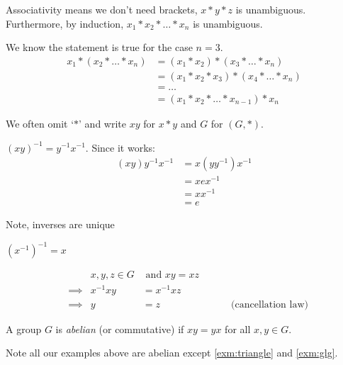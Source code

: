 \begin{remark}
Associativity means we don't need brackets, $x * y * z$ is unambiguous.
Furthermore, by induction, $x_1 * x_2 * \dots * x_n$ is unambiguous.

We know the statement is true for the case $n = 3$.
\begin{align*}
    x_1 * (x_2 * \dots * x_n) &= (x_1 * x_2) * (x_3 * \dots * x_n) \\
    &= (x_1 * x_2 * x_3) * (x_4 * \dots * x_n) \\
    &= \dots \\
    &= (x_1 * x_2 * \dots * x_{n-1}) * x_n
\end{align*}
\end{remark}

\begin{remark}
We often omit `$*$' and write $x y$ for $x * y$ and $G$ for $(G, *)$.
\end{remark}

\begin{remark}
$(xy)^{-1} = y^{-1} x^{-1}$. Since it works:
\begin{align*}
    (xy)y^{-1}x^{-1} &= x(y y^{-1})x^{-1} \\
    &= x e x^{-1} \\
    &= x x^{-1} \\
    &= e
\end{align*}
\end{remark}
Note, inverses are unique

\begin{remark}
$(x^{-1})^{-1} = x$
\end{remark}

\begin{remark} \label{rem:cancellation-law}
\begin{align*} 
    && x, y, z \in G &\text{ and } xy = xz \\
    &\implies & x^{-1} x y &= x^{-1} x z \\
    &\implies & y &= z \hspace{3cm} \text{(cancellation law)}
\end{align*}
\end{remark}


\begin{definition}
A group $G$ is \emph{abelian} (or commutative) if $xy = yx$ for all $x, y \in G$.
\end{definition}

Note all our examples above are abelian except \ref{exm:triangle} and \ref{exm:glg}.

